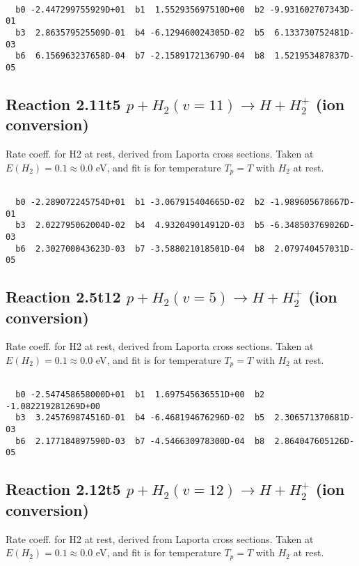 \begin{small}\begin{verbatim}

  b0 -2.447299755929D+01  b1  1.552935697510D+00  b2 -9.931602707343D-01
  b3  2.863579525509D-01  b4 -6.129460024305D-02  b5  6.133730752481D-03
  b6  6.156963237658D-04  b7 -2.158917213679D-04  b8  1.521953487837D-05

\end{verbatim}\end{small}

\newpage
\subsection{
Reaction 2.11t5
$ p + H_2(v=11) \rightarrow H + H_2^+$ (ion conversion)
}
Rate coeff. for H2 at rest, derived from Laporta cross sections.
Taken at $E(H_2) = 0.1 \approx 0.0$ eV,  and fit is for temperature $T_p=T$ with $H_2$ at rest.

\begin{small}\begin{verbatim}

  b0 -2.289072245754D+01  b1 -3.067915404665D-02  b2 -1.989605678667D-01
  b3  2.022795062004D-02  b4  4.932049014912D-03  b5 -6.348503769026D-03
  b6  2.302700043623D-03  b7 -3.588021018501D-04  b8  2.079740457031D-05

\end{verbatim}\end{small}

\newpage
\subsection{
Reaction 2.5t12
$ p + H_2(v=5) \rightarrow H + H_2^+$ (ion conversion)
}
Rate coeff. for H2 at rest, derived from Laporta cross sections.
Taken at $E(H_2) = 0.1 \approx 0.0$ eV,  and fit is for temperature $T_p=T$ with $H_2$ at rest.

\begin{small}\begin{verbatim}

  b0 -2.547458658000D+01  b1  1.697545636551D+00  b2 -1.082219281269D+00
  b3  3.245769874516D-01  b4 -6.468194676296D-02  b5  2.306571370681D-03
  b6  2.177184897590D-03  b7 -4.546630978300D-04  b8  2.864047605126D-05

\end{verbatim}\end{small}

\newpage
\subsection{
Reaction 2.12t5
$ p + H_2(v=12) \rightarrow H + H_2^+$ (ion conversion)
}
Rate coeff. for H2 at rest, derived from Laporta cross sections.
Taken at $E(H_2) = 0.1 \approx 0.0$ eV,  and fit is for temperature $T_p=T$ with $H_2$ at rest.

